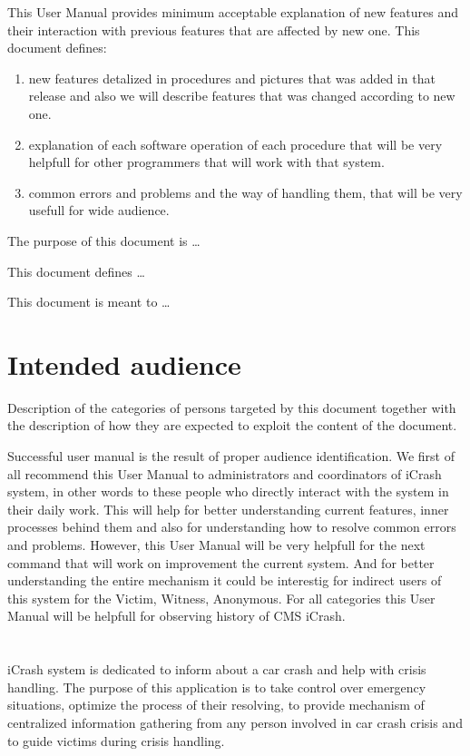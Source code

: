 This User Manual provides minimum acceptable explanation of new
features and their interaction with previous features that are affected by new
one. This document defines:
\begin{enumerate}
  \item new features detalized in procedures and pictures that
was added in that release and also we will describe features that was changed according to new one. 
\item explanation of each software operation of each procedure that will be very helpfull for other programmers that will work with that system.
\item common errors and problems and the way of handling them, that
will be very usefull for wide audience. 
\end{enumerate} 


The purpose of this document is \ldots

This document defines \ldots

This document is meant to \ldots



\section{Intended audience}
Description of the categories of persons targeted by this document together with
the description of how they are expected to exploit the content of the document.

Successful user manual is the result of proper audience identification. We first
of all recommend this User Manual to administrators and coordinators of iCrash
system, in other words to these people who directly interact with the
system in their daily work. This will help for better understanding current
features, inner processes behind them and also for understanding how to resolve common errors
and problems. However, this User Manual will be very helpfull for the next command that will
work on improvement the current system. And for better understanding the entire mechanism it could be interestig for indirect users of this system for the Victim, Witness, Anonymous.
For all categories this User Manual will be helpfull for observing history of
CMS iCrash. 


\section{\mysystemname}
iCrash system is dedicated to inform about a car crash and help with crisis
handling. The purpose of this application is to take control over emergency
situations, optimize the process of their resolving, to provide mechanism of
centralized information gathering from any person involved in car crash crisis
and to guide victims during crisis handling.

